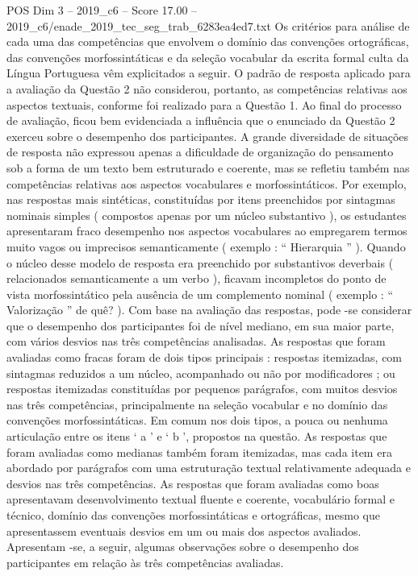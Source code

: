 \begin{textsample}{POS Dim 3 – 2019\_c6 – Score 17.00 – 2019\_c6/enade\_2019\_tec\_seg\_trab\_6283ea4ed7.txt}
Os critérios para análise de cada uma das competências que envolvem o domínio das convenções ortográficas, das convenções morfossintáticas e da seleção vocabular da escrita formal culta da Língua Portuguesa vêm explicitados a seguir.
O padrão de resposta aplicado para a avaliação da Questão 2 não considerou, portanto, as competências relativas aos aspectos textuais, conforme foi realizado para a Questão 1.
Ao final do processo de avaliação, ficou bem evidenciada a influência que o enunciado da Questão 2 exerceu sobre o desempenho dos participantes.
A grande diversidade de situações de resposta não expressou apenas a dificuldade de organização do pensamento sob a forma de um texto bem estruturado e coerente, mas se refletiu também nas competências relativas aos aspectos vocabulares e morfossintáticos.
Por exemplo, nas respostas mais sintéticas, constituídas por itens preenchidos por sintagmas nominais simples ( compostos apenas por um núcleo substantivo ), os estudantes apresentaram fraco desempenho nos aspectos vocabulares ao empregarem termos muito vagos ou imprecisos semanticamente ( exemplo : “ Hierarquia ” ).
Quando o núcleo desse modelo de resposta era preenchido por substantivos deverbais ( relacionados semanticamente a um verbo ), ficavam incompletos do ponto de vista morfossintático pela ausência de um complemento nominal ( exemplo : “ Valorização ” de quê? ).
Com base na avaliação das respostas, pode -se considerar que o desempenho dos participantes foi de nível mediano, em sua maior parte, com vários desvios nas três competências analisadas.
As respostas que foram avaliadas como fracas foram de dois tipos principais : respostas itemizadas, com sintagmas reduzidos a um núcleo, acompanhado ou não por modificadores ; ou respostas itemizadas constituídas por pequenos parágrafos, com muitos desvios nas três competências, principalmente na seleção vocabular e no domínio das convenções morfossintáticas.
Em comum nos dois tipos, a pouca ou nenhuma articulação entre os itens ‘ a ’ e ‘ b ’, propostos na questão.
As respostas que foram avaliadas como medianas também foram itemizadas, mas cada item era abordado por parágrafos com uma estruturação textual relativamente adequada e desvios nas três competências.
As respostas que foram avaliadas como boas apresentavam desenvolvimento textual fluente e coerente, vocabulário formal e técnico, domínio das convenções morfossintáticas e ortográficas, mesmo que apresentassem eventuais desvios em um ou mais dos aspectos avaliados.
Apresentam -se, a seguir, algumas observações sobre o desempenho dos participantes em relação às três competências avaliadas.

\end{textsample}
